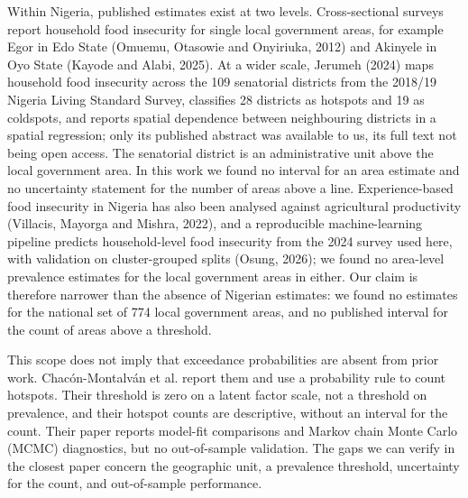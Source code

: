 Within Nigeria, published estimates exist at two levels. Cross-sectional surveys report household food insecurity for single local government areas, for example Egor in Edo State (Omuemu, Otasowie and Onyiriuka, 2012) and Akinyele in Oyo State (Kayode and Alabi, 2025). At a wider scale, Jerumeh (2024) maps household food insecurity across the 109 senatorial districts from the 2018/19 Nigeria Living Standard Survey, classifies 28 districts as hotspots and 19 as coldspots, and reports spatial dependence between neighbouring districts in a spatial regression; only its published abstract was available to us, its full text not being open access. The senatorial district is an administrative unit above the local government area. In this work we found no interval for an area estimate and no uncertainty statement for the number of areas above a line. Experience-based food insecurity in Nigeria has also been analysed against agricultural productivity (Villacis, Mayorga and Mishra, 2022), and a reproducible machine-learning pipeline predicts household-level food insecurity from the 2024 survey used here, with validation on cluster-grouped splits (Osung, 2026); we found no area-level prevalence estimates for the local government areas in either. Our claim is therefore narrower than the absence of Nigerian estimates: we found no estimates for the national set of 774 local government areas, and no published interval for the count of areas above a threshold.

This scope does not imply that exceedance probabilities are absent from prior work. Chacón-Montalván et al. report them and use a probability rule to count hotspots. Their threshold is zero on a latent factor scale, not a threshold on prevalence, and their hotspot counts are descriptive, without an interval for the count. Their paper reports model-fit comparisons and Markov chain Monte Carlo (MCMC) diagnostics, but no out-of-sample validation. The gaps we can verify in the closest paper concern the geographic unit, a prevalence threshold, uncertainty for the count, and out-of-sample performance.


